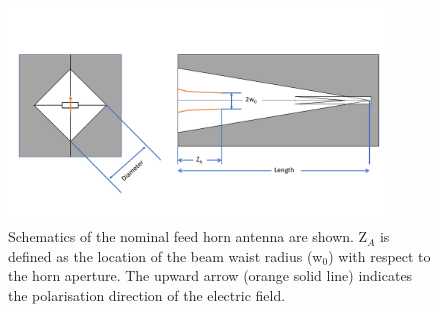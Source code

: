 \begin{figure}[!htb]
    \centering
    \includegraphics[width=0.9\textwidth]{figures/measurements/power-curve-453GHz/THz feed horn.pdf}
    \caption{Schematics of the nominal feed horn antenna are shown. Z$_A$ is defined as the location of the beam waist radius (w$_0$) with respect to the horn aperture. The upward arrow (orange solid line) indicates the polarisation direction of the electric field.}
    \label{fig:feed-horn}
\end{figure}